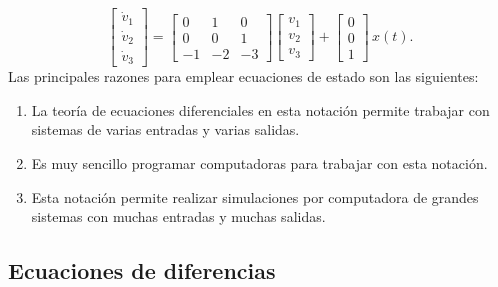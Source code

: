 \begin{equation}
	\begin{bmatrix}
		\dot{v}_{1} \\
		\dot{v}_{2} \\
		\dot{v}_{3}
	\end{bmatrix} 
	= \begin{bmatrix}
		0 & 1 & 0 \\
		0 & 0 & 1 \\
		-1 & -2 & -3
	\end{bmatrix} 
	\begin{bmatrix}
		v_{1}\\
		v_{2}\\
		v_{3}
	\end{bmatrix}
	+
	\begin{bmatrix}
		0 \\
		0 \\
		1
	\end{bmatrix} \, x(t).
\end{equation}
Las principales razones para emplear ecuaciones de estado son las siguientes:
\begin{enumerate}
	\item La teoría de ecuaciones diferenciales en esta notación permite trabajar con sistemas de varias entradas y varias salidas.
	\item Es muy sencillo programar computadoras para trabajar con esta notación.
	\item Esta notación permite realizar simulaciones por computadora de grandes sistemas con muchas entradas y muchas salidas.
\end{enumerate}

\subsection{Ecuaciones de diferencias}

